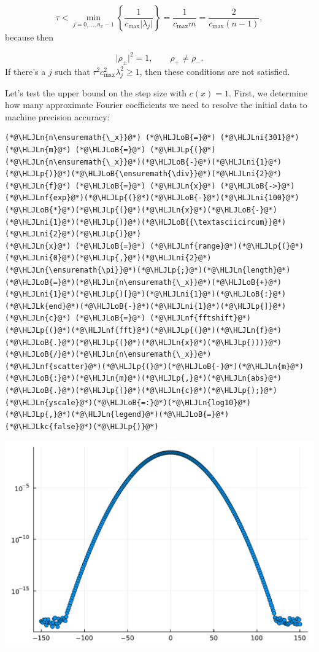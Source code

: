 \documentclass[12pt,a4paper]{article}
\newcommand{\HLJLk}[1]{\textcolor[RGB]{148,91,176}{\textbf{#1}}}
\newcommand{\HLJLkc}[1]{\textcolor[RGB]{59,151,46}{\textit{#1}}}
\newcommand{\HLJLn}[1]{#1}
\newcommand{\HLJLnf}[1]{\textcolor[RGB]{66,102,213}{#1}}
\newcommand{\HLJLni}[1]{\textcolor[RGB]{59,151,46}{#1}}
\newcommand{\HLJLoB}[1]{\textcolor[RGB]{102,102,102}{\textbf{#1}}}
\newcommand{\HLJLp}[1]{#1}
\begin{document}
\[
\tau < \min_{j = 0, \ldots, n_x-1} \left\lbrace \frac{ 1}{c_{\max}\vert\lambda_j\vert}\right\rbrace = \frac{ 1}{c_{\max}m} = \frac{2}{c_{\max}(n-1)},
\]
because then

\[
\vert \rho_{\pm} \vert^2 = 1, \qquad \rho_+ \neq \rho_-.
\]
If there's a $j$ such that $\tau^2 c_{\max}^2 \lambda_j^2 \geq 1$, then these conditions are not satisfied.

Let's test the upper bound on the step size with $c(x) = 1$. First, we determine how many approximate Fourier coefficients we need to resolve the initial data to machine precision accuracy:


\begin{lstlisting}
(*@\HLJLn{n\ensuremath{\_x}}@*) (*@\HLJLoB{=}@*) (*@\HLJLni{301}@*)
(*@\HLJLn{m}@*) (*@\HLJLoB{=}@*) (*@\HLJLp{(}@*)(*@\HLJLn{n\ensuremath{\_x}}@*)(*@\HLJLoB{-}@*)(*@\HLJLni{1}@*)(*@\HLJLp{)}@*)(*@\HLJLoB{\ensuremath{\div}}@*)(*@\HLJLni{2}@*)
(*@\HLJLn{f}@*) (*@\HLJLoB{=}@*) (*@\HLJLn{x}@*) (*@\HLJLoB{->}@*) (*@\HLJLnf{exp}@*)(*@\HLJLp{(}@*)(*@\HLJLoB{-}@*)(*@\HLJLni{100}@*)(*@\HLJLoB{*}@*)(*@\HLJLp{(}@*)(*@\HLJLn{x}@*)(*@\HLJLoB{-}@*)(*@\HLJLni{1}@*)(*@\HLJLp{)}@*)(*@\HLJLoB{{\textasciicircum}}@*)(*@\HLJLni{2}@*)(*@\HLJLp{)}@*)
(*@\HLJLn{x}@*) (*@\HLJLoB{=}@*) (*@\HLJLnf{range}@*)(*@\HLJLp{(}@*)(*@\HLJLni{0}@*)(*@\HLJLp{,}@*)(*@\HLJLni{2}@*)(*@\HLJLn{\ensuremath{\pi}}@*)(*@\HLJLp{;}@*)(*@\HLJLn{length}@*)(*@\HLJLoB{=}@*)(*@\HLJLn{n\ensuremath{\_x}}@*)(*@\HLJLoB{+}@*)(*@\HLJLni{1}@*)(*@\HLJLp{)[}@*)(*@\HLJLni{1}@*)(*@\HLJLoB{:}@*)(*@\HLJLk{end}@*)(*@\HLJLoB{-}@*)(*@\HLJLni{1}@*)(*@\HLJLp{]}@*)
(*@\HLJLn{c}@*) (*@\HLJLoB{=}@*) (*@\HLJLnf{fftshift}@*)(*@\HLJLp{(}@*)(*@\HLJLnf{fft}@*)(*@\HLJLp{(}@*)(*@\HLJLn{f}@*)(*@\HLJLoB{.}@*)(*@\HLJLp{(}@*)(*@\HLJLn{x}@*)(*@\HLJLp{)))}@*)(*@\HLJLoB{/}@*)(*@\HLJLn{n\ensuremath{\_x}}@*)
(*@\HLJLnf{scatter}@*)(*@\HLJLp{(}@*)(*@\HLJLoB{-}@*)(*@\HLJLn{m}@*)(*@\HLJLoB{:}@*)(*@\HLJLn{m}@*)(*@\HLJLp{,}@*)(*@\HLJLn{abs}@*)(*@\HLJLoB{.}@*)(*@\HLJLp{(}@*)(*@\HLJLn{c}@*)(*@\HLJLp{);}@*)(*@\HLJLn{yscale}@*)(*@\HLJLoB{=:}@*)(*@\HLJLn{log10}@*)(*@\HLJLp{,}@*)(*@\HLJLn{legend}@*)(*@\HLJLoB{=}@*)(*@\HLJLkc{false}@*)(*@\HLJLp{)}@*)
\end{lstlisting}

\includegraphics[width=\linewidth]{jl_Vz6qXN/Chapter5_61_1.pdf}
\end{document}
